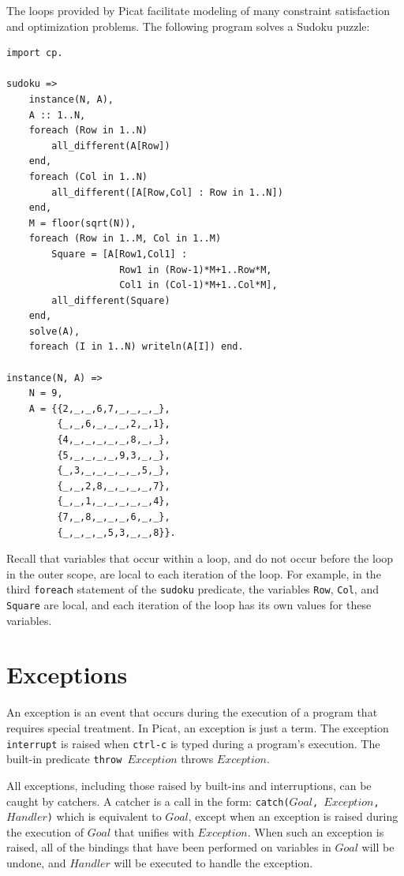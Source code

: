 The loops provided by Picat facilitate modeling of many constraint satisfaction and optimization problems. The following program solves a Sudoku puzzle:
\begin{verbatim}
import cp.

sudoku =>
    instance(N, A),
    A :: 1..N,
    foreach (Row in 1..N)
        all_different(A[Row])
    end,
    foreach (Col in 1..N)
        all_different([A[Row,Col] : Row in 1..N])
    end,
    M = floor(sqrt(N)),
    foreach (Row in 1..M, Col in 1..M) 
        Square = [A[Row1,Col1] : 
                    Row1 in (Row-1)*M+1..Row*M, 
                    Col1 in (Col-1)*M+1..Col*M],
        all_different(Square)
    end,
    solve(A),
    foreach (I in 1..N) writeln(A[I]) end.

instance(N, A) =>
    N = 9,
    A = {{2,_,_,6,7,_,_,_,_},
         {_,_,6,_,_,_,2,_,1},
         {4,_,_,_,_,_,8,_,_},
         {5,_,_,_,_,9,3,_,_},
         {_,3,_,_,_,_,_,5,_},
         {_,_,2,8,_,_,_,_,7},
         {_,_,1,_,_,_,_,_,4},
         {7,_,8,_,_,_,6,_,_},
         {_,_,_,_,5,3,_,_,8}}.
\end{verbatim}
Recall that variables that occur within a loop, and do not occur before the loop in the outer scope, are local to each iteration of the loop. For example, in the third \texttt{foreach} statement of the \texttt{sudoku} predicate, the variables \texttt{Row}, \texttt{Col}, and \texttt{Square} are local, and each iteration of the loop has its own values for these variables.

\section{Exceptions}
An exception is an event that occurs during the execution of a program that requires special treatment. In Picat, an exception is just a term. The exception \texttt{interrupt} is raised when \texttt{ctrl-c} is typed during a program's execution. The built-in predicate \texttt{throw $Exception$} throws $Exception$. 

All exceptions, including those raised by built-ins and interruptions, can be caught by catchers. A catcher is a call in the form: {\tt catch($Goal$, $Exception$, $Handler$)} which is equivalent to $Goal$, except when an exception is raised during the execution of $Goal$ that unifies with $Exception$. When such an exception is raised, all of the bindings that have been performed on variables in $Goal$ will be undone, and $Handler$ will be executed to handle the exception. 

